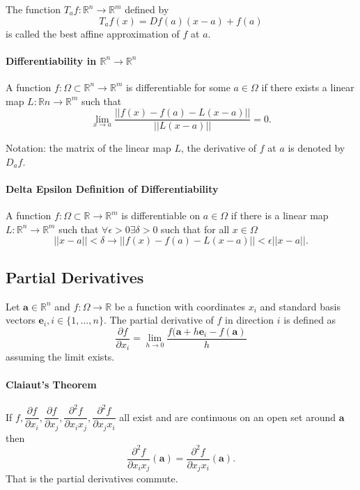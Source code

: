The function \(T_af:\mathbb{R}^n \to \mathbb{R}^m\) defined by 
\[T_af(x) = Df(a)(x-a) + f(a)\] is called the best affine approximation of \(f\) at \(a\).

\paragraph{Differentiability in \(\mathbb{R}^n\to \mathbb{R}^n\)}

A function \(f: \Omega\subset \mathbb{R}^n \to \mathbb{R}^m\) is differentiable for some
\(a\in\Omega\) if there exists a linear map \(L: \mathbb{R}n\to \mathbb{R}^m\)
such that
\[
\lim_{x\to a} \frac{
    \left|\left|f(x) - f(a) -L(x-a)\right|\right|
} {
    \left|\left|L(x-a)\right|\right|
} = 0.
\]

Notation: the matrix of the linear map \(L\), the derivative of \(f\) at
\(a\) is denoted by \(D_af\).

\paragraph{Delta Epsilon Definition of Differentiability}
A function \(f: \Omega\subset \mathbb{R}\to \mathbb{R}^m\) is 
differentiable on \(a\in \Omega\) if there is a linear map \(L: \mathbb{R}^n\to \mathbb{R}^m\)
such that \(\forall \epsilon > 0 \exists \delta > 0 \)
such that for all \(x\in \Omega\)
\[
\left|\left|x - a\right|\right| < \delta
\to
\left|\left|f(x) - f(a) - L(x-a)\right|\right|
< \epsilon\left|\left|x - a\right|\right|. 
\]

\subsection{Partial Derivatives}
Let \(\textbf{a}\in\mathbb{R}^n\) and \(f:\Omega\to\mathbb{R}\) be a function with 
coordinates \(x_i\) and standard basis vectors \(\textbf{e}_i, i\in \{1,\dots,n\}\).
The partial derivative of \(f\) in direction \(i\) is defined as
\[
    \frac{\partial f}{\partial x_i} = \lim_{h\to 0} 
    \frac{f(\textbf{a}+h\textbf{e}_i -f(\textbf{a})}{h}
\]
assuming the limit exists.

\paragraph{Claiaut's Theorem}
 If 
 \(f, \dfrac{\partial f}{\partial x_i}, \dfrac{\partial f}{\partial x_j}, \dfrac{\partial^2 f}{\partial x_i x_j}, \dfrac{\partial^2 f}{\partial x_j x_i}\) all exist and are continuous on
 an open set around \(\textbf{a}\) then
 \[\frac{\partial^2 f}{\partial x_i x_j}(\textbf{a})=\frac{\partial^2 f}{\partial x_j x_i }(\textbf{a}).\]
 That is the partial derivatives commute.

